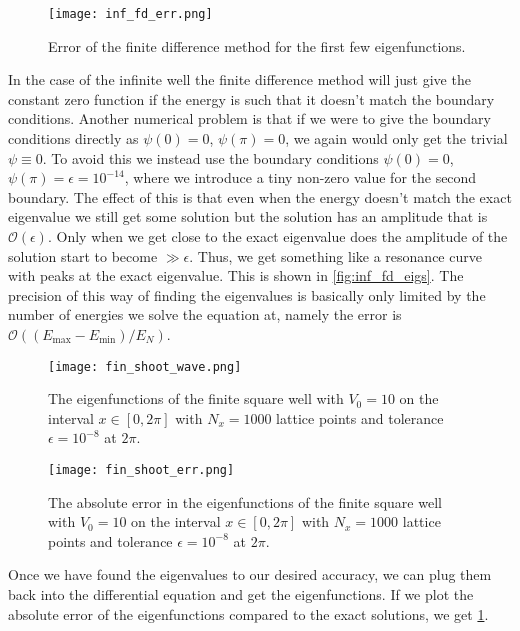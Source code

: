 \documentclass[10pt,a4paper,twocolumn]{article}
\begin{document}
\begin{figure}
    \centering
    \captionsetup{justification=centering}
    \texttt{[image: inf\_fd\_err.png]}
    \caption{Error of the finite difference method for the first few eigenfunctions.}
    \label{fig:inf_fd_err}
\end{figure}

In the case of the infinite well the finite difference method will just give the constant zero function if the energy is such that it doesn't match the boundary conditions. Another numerical problem is that if we were to give the boundary conditions directly as $\psi(0)=0$, $\psi(\pi)=0$, we again would only get the trivial $\psi \equiv 0$. To avoid this we instead use the boundary conditions $\psi(0)=0$, $\psi(\pi) = \epsilon = 10^{-14}$, where we introduce a tiny non-zero value for the second boundary. The effect of this is that even when the energy doesn't match the exact eigenvalue we still get some solution but the solution has an amplitude that is $\mathcal{O}(\epsilon)$. Only when we get close to the exact eigenvalue does the amplitude of the solution start to become $\gg \epsilon$. Thus, we get something like a resonance curve with peaks at the exact eigenvalue. This is shown in \cref{fig:inf_fd_eigs}. The precision of this way of finding the eigenvalues is basically only limited by the number of energies we solve the equation at, namely the error is $\mathcal{O}\left((E_{\mathrm{max}} - E_{\mathrm{min}})/ E_N\right)$. 

\begin{figure}
    \centering
    \captionsetup{justification=centering}
    \texttt{[image: fin\_shoot\_wave.png]}
    \caption{The eigenfunctions of the finite square well with $V_0 = 10$ on the interval $x \in [0, 2 \pi]$ with $N_x = 1000$ lattice points and tolerance $\epsilon = 10^{-8}$ at $2 \pi$.}
    \label{fig:fin_shoot_wave}
\end{figure}

\begin{figure}
    \centering
    \captionsetup{justification=centering}
    \texttt{[image: fin\_shoot\_err.png]}
    \caption{The absolute error in the eigenfunctions of the finite square well with $V_0 = 10$ on the interval $x \in [0, 2\pi]$ with $N_x = 1000$ lattice points and tolerance $\epsilon = 10^{-8}$ at $2 \pi$.}
    \label{fig:fin_shoot_err}
\end{figure}


Once we have found the eigenvalues to our desired accuracy, we can plug them back into the differential equation and get the eigenfunctions. If we plot the absolute error of the eigenfunctions compared to the exact solutions, we get \cref{fig:inf_fd_err}.
\end{document}
